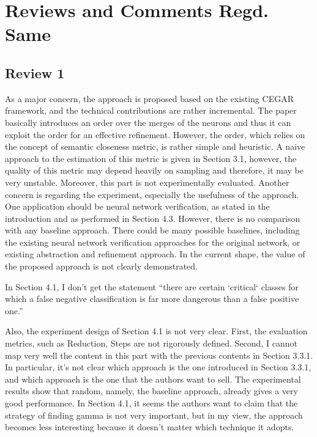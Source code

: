 \section{Reviews and Comments Regd. Same}

\subsection{Review 1}

 As a major concern, the approach is proposed based on the existing  CEGAR
 framework, and the technical contributions are rather  incremental. The paper
 basically introduces an order over the merges  of the neurons and thus it can
 exploit the order for an effective  refinement. However, the order, which
 relies on the concept of  semantic closeness metric, is rather simple and
 heuristic. A naive  approach to the estimation of this metric is given in
 Section 3.1,  however, the quality of this metric may depend heavily on
 sampling and  therefore, it may be very unstable. Moreover, this part is not
 experimentally evaluated.   Another concern is regarding the experiment,
 especially the usefulness  of the approach. One application should be neural
 network  verification, as stated in the introduction and as performed in
 Section 4.3. However, there is no comparison with any baseline  approach. There
 could be many possible baselines, including the  existing neural network
 verification approaches for the original  network, or existing abstraction and
 refinement approach. In the  current shape, the value of the proposed approach
 is not clearly  demonstrated.


  In Section 4.1, I don’t get the statement “there are certain  ‘critical‘
  classes for which a false negative classification is far  more dangerous than
  a false positive one.” 

  Also, the experiment design of Section 4.1 is not very clear. First,  the
  evaluation metrics, such as Reduction, Steps are not rigorously  defined.
  Second, I cannot map very well the content in this part with  the previous
  contents in Section 3.3.1. In particular, it’s not clear  which approach is
  the one introduced in Section 3.3.1, and which  approach is the one that the
  authors want to sell. The experimental  results show that random, namely, the
  baseline approach, already gives  a very good performance.
  In Section 4.1, it seems the authors want to claim that the strategy  of
  finding gamma is not very important, but in my view, the approach  becomes
  less interesting because it doesn’t matter which technique it  adopts.

